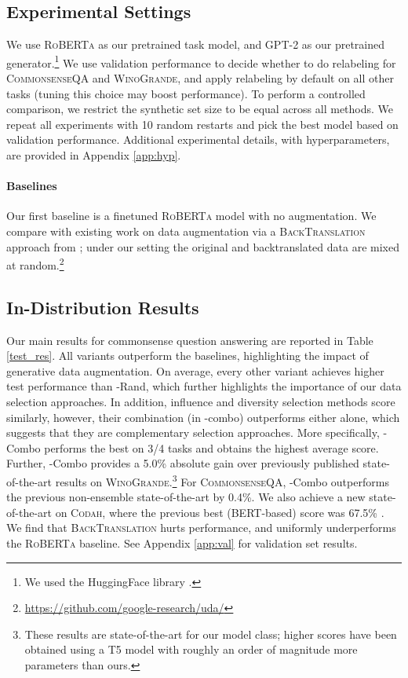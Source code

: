 \documentclass[11pt,a4paper]{article}
\newcommand{\gdaug}{}
\newcommand{\winogrande}{\textsc{WinoGrande}\xspace}
\newcommand{\codah}{\textsc{Codah}\xspace}
\newcommand{\comqa}{\textsc{CommonsenseQA}\xspace}
\newcommand{\gpt}{\textsc{GPT-2}\xspace}
\newcommand{\bert}{\textsc{BERT}\xspace}
\newcommand{\roberta}{\textsc{RoBERTa}\xspace}
\newcommand{\backt}{\textsc{BackTranslation}\xspace}
\begin{document}
\subsection{Experimental Settings}
\label{ref:sec-exp:settings}
We use \roberta \cite{liu2019roberta} as our pretrained task model, and \gpt \cite{radford2019language} as our pretrained generator.\footnote{We used the HuggingFace library \cite{Wolf2019HuggingFacesTS}.}
We use validation performance to decide whether to do relabeling for \comqa and \winogrande, and apply relabeling by default on all other tasks (tuning this choice may boost performance).
To perform a controlled comparison, we restrict the synthetic set size to be equal across all methods. 
We repeat all experiments with 10 random restarts and pick the best model based on validation performance.
Additional experimental details, with hyperparameters, are provided in Appendix  \ref{app:hyp}. 


\paragraph{Baselines}
Our first baseline is a finetuned \roberta model with no augmentation. 
We compare with existing work on data augmentation via a \backt approach from \citet{xie2019unsupervised}; under our setting the original and backtranslated data are mixed at random.\footnote{\url{https://github.com/google-research/uda/}}
 \subsection{In-Distribution Results}
\label{sec:res_ana}



Our main results for commonsense question answering are reported in Table \ref{test_res}. 
All \gdaug variants outperform the baselines, highlighting the impact of generative data augmentation.
On average, every other variant achieves higher test performance than \gdaug-Rand, which further highlights the importance of our data selection approaches. In addition, influence and diversity selection methods score similarly, however, their combination (in \gdaug-combo) outperforms either alone, which suggests that they are complementary selection approaches.
More specifically, \gdaug-Combo performs the best on 3/4 tasks and obtains the highest average score. 
Further, \gdaug-Combo provides a 5.0\% absolute gain over previously published state-of-the-art results on \winogrande.\footnote{These results are state-of-the-art for our model class; higher scores have been obtained using a T5 model with roughly an order of magnitude more parameters than ours.} 
For \comqa, \gdaug-Combo outperforms the previous non-ensemble state-of-the-art \cite{Zhu2019FreeLBEA} by 0.4\%. 
We also achieve a new state-of-the-art on \codah, where the previous best (\bert-based) score was 67.5\% \cite{Chen2019CODAHAA}.
We find that \backt hurts performance, and uniformly underperforms the \roberta baseline.  See Appendix \ref{app:val} for validation set results.
\end{document}
